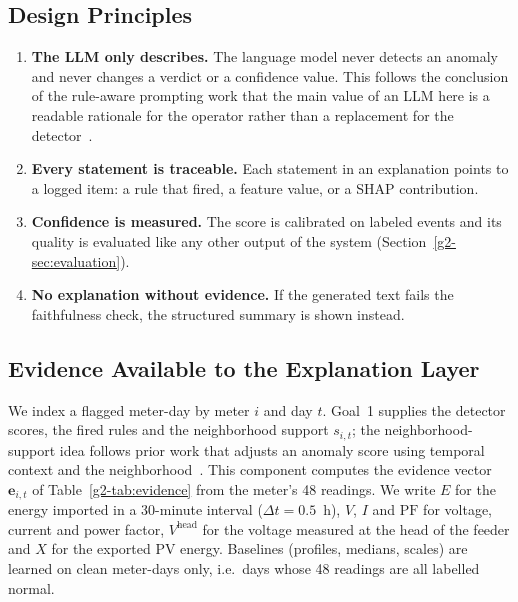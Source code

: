 \subsection{Design Principles}
\begin{enumerate}[leftmargin=*,itemsep=2pt]
  \item \textbf{The LLM only describes.} The language model never detects an anomaly and never changes a verdict or a confidence value. This follows the conclusion of the rule-aware prompting work that the main value of an LLM here is a readable rationale for the operator rather than a replacement for the detector~\cite{ruleaware}.
  \item \textbf{Every statement is traceable.} Each statement in an explanation points to a logged item: a rule that fired, a feature value, or a SHAP contribution.
  \item \textbf{Confidence is measured.} The score is calibrated on labeled events and its quality is evaluated like any other output of the system (Section~\ref{g2-sec:evaluation}).
  \item \textbf{No explanation without evidence.} If the generated text fails the faithfulness check, the structured summary is shown instead.
\end{enumerate}

\subsection{Evidence Available to the Explanation Layer}
\label{g2-sec:evidence}
We index a flagged meter-day by meter $i$ and day $t$. Goal~1 supplies the detector scores, the fired rules
and the neighborhood support $s_{i,t}$; the neighborhood-support idea follows prior work that adjusts an
anomaly score using temporal context and the neighborhood~\cite{multiuser}. This component computes the
evidence vector $\mathbf{e}_{i,t}$ of Table~\ref{g2-tab:evidence} from the meter's 48 readings. We write $E$ for
the energy imported in a 30-minute interval ($\Delta t=0.5$~h), $V$, $I$ and $\mathrm{PF}$ for voltage,
current and power factor, $V^{\mathrm{head}}$ for the voltage measured at the head of the feeder and $X$ for
the exported PV energy. Baselines (profiles, medians, scales) are learned on clean meter-days only, i.e.\ days
whose 48 readings are all labelled normal.

